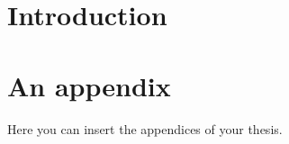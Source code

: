 \documentclass[
  digital, %
  oneside, %
  lof,     %
  lot,     %
]{fithesis4}
\begin{document}
\chapter*{Introduction}

\appendix %
\chapter{An appendix}
Here you can insert the appendices of your thesis.
\end{document}

